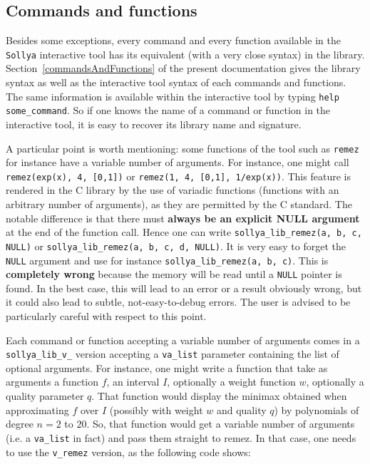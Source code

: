 \documentclass[a4paper]{article}
\newcommand{\sollya}{\texttt{Sollya}\xspace}
\begin{document}
\subsection{Commands and functions}
\label{library_commands_and_functions}
Besides some exceptions, every command and every function available in the \sollya interactive tool has its equivalent (with a very close syntax) in the library. Section~\ref{commandsAndFunctions} of the present documentation gives the library syntax as well as the interactive tool syntax of each commands and functions. The same information is available within the interactive tool by typing \texttt{help some\_command}. So if one knows the name of a command or function in the interactive tool, it is easy to recover its library name and signature.

A particular point is worth mentioning: some functions of the tool such as \texttt{remez} for instance have a variable number of arguments. For instance, one might call \texttt{remez(exp(x), 4, [0,1])} or \texttt{remez(1, 4, [0,1], 1/exp(x))}. This feature is rendered in the C library by the use of variadic functions (functions with an arbitrary number of arguments), as they are permitted by the C standard. The notable difference is that there must \textbf{always be an explicit NULL argument} at the end of the function call. Hence one can write \texttt{sollya\_lib\_remez(a, b, c, NULL)} or \texttt{sollya\_lib\_remez(a, b, c, d, NULL)}. It is very easy to forget the \texttt{NULL} argument and use for instance \texttt{sollya\_lib\_remez(a, b, c)}. This is \textbf{completely wrong} because the memory will be read until a \texttt{NULL} pointer is found. In the best case, this will lead to an error or a result obviously wrong, but it could also lead to subtle, not-easy-to-debug errors. The user is advised to be particularly careful with respect to this point.

Each command or function accepting a variable number of arguments comes in a \texttt{sollya\_lib\_v\_} version accepting a \texttt{va\_list} parameter containing the list of optional arguments. For instance, one might write a function that take as arguments a function $f$, an interval $I$, optionally a weight function $w$, optionally a quality parameter $q$. That function would display the minimax obtained when approximating $f$ over $I$ (possibly with weight $w$ and quality $q$) by polynomials of degree $n=2$ to $20$. So, that function would get a variable number of arguments (i.e. a \texttt{va\_list} in fact) and pass them straight to remez. In that case, one needs to use the \texttt{v\_remez} version, as the following code shows:
\end{document}
